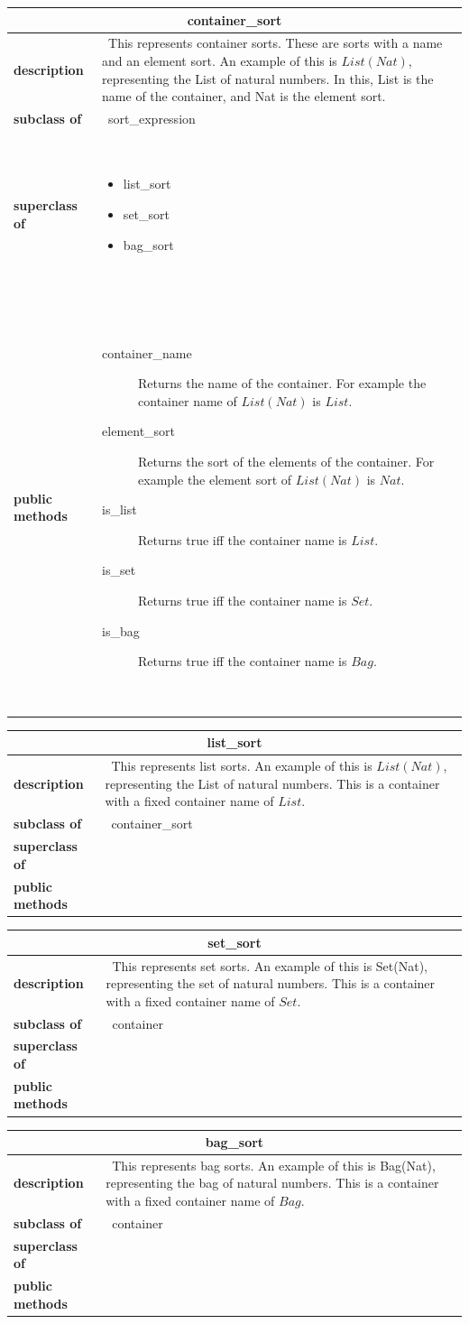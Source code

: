 \documentclass[a4paper,11pt]{article}
\newcommand{\List}{{\mathit{List}}}
\newcommand{\dataclass}[5]{
\begin{flushleft}
\begin{longtable}{p{3cm} p{11cm}}
\multicolumn{2}{c}{\textbf{#1}}\\\hline\hline
\textbf{description} & ~#2~ \\\hline
\textbf{subclass of} & ~#3~ \\\hline
\textbf{superclass of} & ~#4~ \\\hline
\textbf{public methods} & ~#5~ \\\hline
\end{longtable}
\end{flushleft}
}
\begin{document}
\dataclass
  {container\_sort}
  {This represents container sorts. These are sorts with a name and an element sort. An example of this is $\List(Nat)$, representing the List of natural numbers. In this, List is the name of the container, and Nat is the element sort.}
  {sort\_expression}
  {\begin{itemize}
    \item list\_sort
    \item set\_sort
    \item bag\_sort
   \end{itemize}}
  {\begin{description}
    \item[container\_name] Returns the name of the container. For example the container name of $\List(Nat)$ is $List$.
    \item[element\_sort] Returns the sort of the elements of the container. For example the element sort of $\List(Nat)$ is $Nat$.
    \item[is\_list] Returns true iff the container name is $List$.
    \item[is\_set] Returns true iff the container name is $Set$.
    \item[is\_bag] Returns true iff the container name is $Bag$.
   \end{description}}


\dataclass
  {list\_sort}
  {This represents list sorts. An example of this is $\List(Nat)$, representing the List of natural numbers. This is a container with a fixed container name of $List$.}
  {container\_sort}
  {}
  {}


\dataclass
  {set\_sort}
  {This represents set sorts. An example of this is Set(Nat), representing the set of natural numbers. This is a container with a fixed container name of $Set$.}
  {container}
  {}
  {}


\dataclass
  {bag\_sort}
  {This represents bag sorts. An example of this is Bag(Nat), representing the bag of natural numbers. This is a container with a fixed container name of $Bag$.}
  {container}
  {}
  {}

\end{document}
